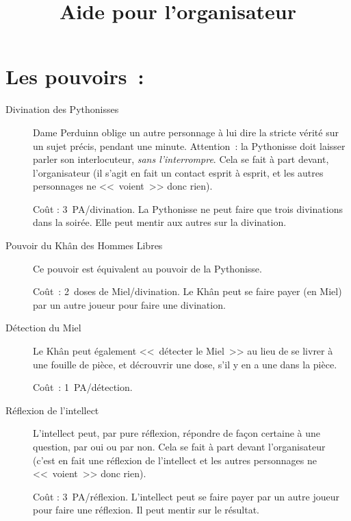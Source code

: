 \documentclass{article}
\title{Aide pour l'organisateur}
\date{}
\begin{document}
\maketitle

\section*{Les pouvoirs~:}

\begin{description}
    \item[Divination des Pythonisses] Dame Perduinn oblige un autre personnage
        à lui dire la stricte vérité sur un sujet précis, pendant une minute.
        Attention~: la Pythonisse doit laisser parler son interlocuteur,
        \emph{sans l’interrompre}.  Cela se fait à part devant, l’organisateur
        (il s'agit en fait un contact esprit à esprit, et les autres
        personnages ne <<~voient~>> donc rien).
        
        Coût : 3~PA/divination. La Pythonisse ne peut faire que trois
        divinations dans la soirée. Elle peut mentir aux autres sur la
        divination.

    \item[Pouvoir du Khân des Hommes Libres] Ce pouvoir est équivalent au
        pouvoir de la Pythonisse.

        Coût~: 2~doses de Miel/divination. Le Khân peut se faire payer (en
        Miel) par un autre joueur pour faire une divination.

    \item[Détection du Miel] Le Khân peut également <<~détecter le Miel~>> au
        lieu de se livrer à une fouille de pièce, et décrouvrir une dose, s'il
        y en a une dans la pièce.

        Coût~: 1~PA/détection.

    \item[Réflexion de l'intellect] L’intellect peut, par pure réflexion,
        répondre de façon certaine à une question, par oui ou par non. Cela se
        fait à part devant l’organisateur (c’est en fait une réflexion de
        l’intellect et les autres personnages ne <<~voient~>> donc rien).
        
        Coût : 3~PA/réflexion. L’intellect peut se faire payer par un autre
        joueur pour faire une réflexion. Il peut mentir sur le résultat.

\end{description}
\end{document}
